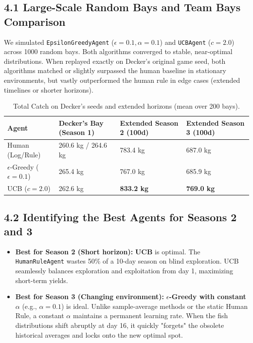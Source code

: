 \documentclass[11pt, a4paper]{article}
\begin{document}
\subsection*{4.1 Large-Scale Random Bays and Team Bays Comparison}
We simulated \texttt{EpsilonGreedyAgent} ($\epsilon=0.1, \alpha=0.1$) and \texttt{UCBAgent} ($c=2.0$) across 1000 random bays. Both algorithms converged to stable, near-optimal distributions. When replayed exactly on Decker's original game seed, both algorithms matched or slightly surpassed the human baseline in stationary environments, but vastly outperformed the human rule in edge cases (extended timelines or shorter horizons).

\begin{table}[h]
\centering
\begin{tabular}{l l l l}
\toprule
\textbf{Agent} & \textbf{Decker's Bay (Season 1)} & \textbf{Extended Season 2 (100d)} & \textbf{Extended Season 3 (100d)} \\
\midrule
Human (Log/Rule) & 260.6 kg / 264.6 kg & 783.4 kg & 687.0 kg \\
$\epsilon$-Greedy ($\epsilon=0.1$) & 265.4 kg & 767.0 kg & 685.9 kg \\
UCB ($c=2.0$) & 262.6 kg & \textbf{833.2 kg} & \textbf{769.0 kg} \\
\bottomrule
\end{tabular}
\caption{Total Catch on Decker's seeds and extended horizons (mean over 200 bays).}
\label{tab:evaluation}
\end{table}

\subsection*{4.2 Identifying the Best Agents for Seasons 2 and 3}
\begin{itemize}
    \item \textbf{Best for Season 2 (Short horizon):} \textbf{UCB} is optimal. The \texttt{HumanRuleAgent} wastes 50\% of a 10-day season on blind exploration. UCB seamlessly balances exploration and exploitation from day 1, maximizing short-term yields.
    \item \textbf{Best for Season 3 (Changing environment):} \textbf{$\epsilon$-Greedy with constant $\alpha$} (e.g., $\alpha=0.1$) is ideal. Unlike sample-average methods or the static Human Rule, a constant $\alpha$ maintains a permanent learning rate. When the fish distributions shift abruptly at day 16, it quickly "forgets" the obsolete historical averages and locks onto the new optimal spot.
\end{itemize}
\end{document}
